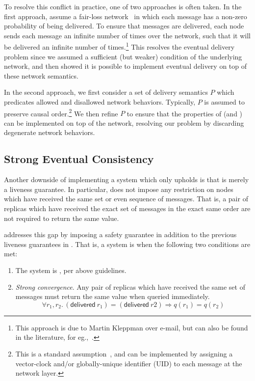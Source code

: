 To resolve this conflict in practice, one of two approaches is often taken. In
the first approach, assume a fair-loss network~\citep{cachin11} in which each
message has a non-zero probability of being delivered. To ensure that messages
are delivered, each node sends each message an infinite number of times over the
network, such that it will be delivered an infinite number of
times.\footnote{This approach is due to Martin Kleppman over e-mail, but can
also be found in the literature, for eg.,~\citet{shapiro11}.} This
resolves the eventual delivery problem since we assumed a sufficient (but
weaker) condition of the underlying network, and then showed it is possible to
implement eventual delivery on top of these network semantics.

In the second approach, we first consider a set of delivery semantics $P$ which
predicates allowed and disallowed network behaviors. Typically, $P$ is assumed
to preserve causal order.\footnote{This is a standard
assumption~\citep{shapiro11,gomes17}, and can be implemented by assigning a
vector-clock and/or globally-unique identifier (UID) to each message at the
network layer.} We then refine $P$ to ensure that the properties of \EC (and
\SEC) can be implemented on top of the network, resolving our problem by
discarding degenerate network behaviors.

\subsection{Strong Eventual Consistency}
Another downside of implementing a system which only upholds \EC is that \EC is
merely a liveness guarantee. In particular, \EC does not impose any restriction
on nodes which have received the same set or even sequence of messages. That is,
a pair of replicas which have received the exact set of messages in the exact
same order are not required to return the same value.

\SEC addresses this gap by imposing a safety guarantee in addition to the
previous liveness guarantees in \EC. That is, a system is \SEC when the
following two conditions are met:
\begin{enumerate}
  \item The system is \EC, per above guidelines.
  \item \emph{Strong convergence}. Any pair of replicas which have received the
    same set of messages must return the same value when queried immediately.
    \[
      \forall r_1, r_2.\, (\textsf{delivered}~r_1) = (\textsf{delivered}~r2)
        \Rightarrow q(r_1) = q(r_2)
    \]
\end{enumerate}

